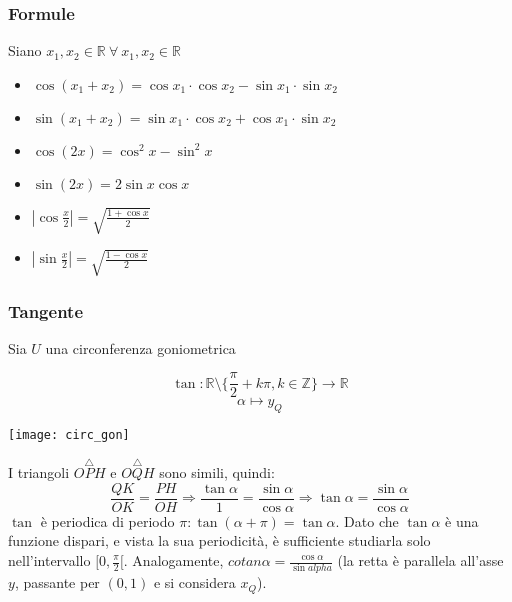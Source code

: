         \subsubsection*{Formule}
            Siano $x_{1}, x_{2} \in \mathbb{R}\ \forall\ x_{1},x_{2} \in \mathbb{R}$
            \begin{Large}
                \begin{itemize}
                    \item $\cos{(x_{1} + x_{2})} = \cos{x_{1}} \cdot \cos{x_{2}} - \sin{x_{1} \cdot \sin{x_{2}}}$
                    \item $\sin{(x_{1} + x_{2})} = \sin{x_{1}} \cdot \cos{x_{2}} + \cos{x_{1} \cdot \sin{x_{2}}}$
                    \item $\cos{(2x)} = \cos^{2}{x} - \sin^{2}{x}$
                    \item $\sin{(2x)} = 2\sin{x}\cos{x}$
                    \item $|\cos{\frac{x}{2}}| = \sqrt{\frac{1 + \cos{x}}{2}}$
                    \item $|\sin{\frac{x}{2}}| = \sqrt{\frac{1 - \cos{x}}{2}}$
                \end{itemize}
            \end{Large}
    \subsubsection{Tangente}
        Sia $U$ una circonferenza goniometrica
        \begin{Large}
            \[
                \tan:\mathbb{R} \setminus \{\frac{\pi}{2} + k\pi, k \in \mathbb{Z}\} \rightarrow \mathbb{R}
            \]
            \[
                \alpha \mapsto y_{Q}    
            \]
        \end{Large}
        \begin{center}
            \texttt{[image: circ\_gon]}
        \end{center}
        I triangoli $O\overset{\triangle}{P}H$ e $O\overset{\triangle}{Q}H$ sono simili, quindi:
        \[
            \frac{QK}{OK} = \frac{PH}{OH} \Rightarrow \frac{\tan{\alpha}}{1} = \frac{\sin{\alpha}}{\cos{\alpha}} \Rightarrow \tan{\alpha} = \frac{\sin{\alpha}}{\cos{\alpha}}    
        \]
        $\tan$ è periodica di periodo $\pi: \tan{(\alpha + \pi)} = \tan{\alpha}$. Dato che $\tan{\alpha}$ è una funzione dispari, e vista 
        la sua periodicità, è sufficiente studiarla solo nell'intervallo $[0, \frac{\pi}{2}[$.
        Analogamente, $cotan{\alpha} = \frac{\cos{\alpha}}{\sin{alpha}}$ (la retta è parallela all'asse $y$, passante per $(0,1)$ e si considera $x_{Q}$).
            
